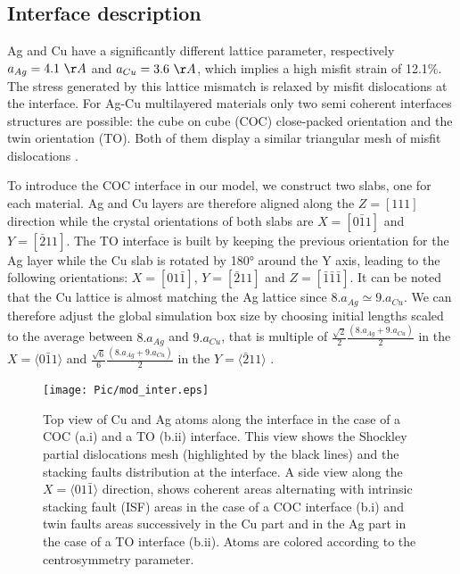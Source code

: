 \documentclass[final,3p,times,twocolumn]{elsarticle}
\begin{document}
	\subsection{Interface description}
	\label{subpart_interface}
Ag and Cu have a significantly different lattice parameter, respectively $a_{Ag}=4.1~\AA$ and $a_{Cu}=3.6~\AA$, which implies a high misfit strain of 12.1\%. The stress generated by this lattice mismatch is relaxed by misfit dislocations at the interface. For Ag-Cu multilayered materials only two semi coherent interfaces structures are possible: the cube on cube (COC) close-packed orientation and the twin orientation (TO). Both of them display a similar triangular mesh of misfit dislocations \cite{wang11SM,an15APL}.

To introduce the COC interface in our model, we construct two slabs, one for each material. Ag and Cu layers are therefore aligned along the $Z=[111]$ direction while the crystal orientations of both slabs are $X=[0\bar{1}1]$ and $Y=[\bar{2}11]$. The TO interface is built by keeping the previous orientation for the Ag layer while the Cu slab is rotated by 180° around the Y axis, leading to the following orientations: $X=[01\bar{1}]$, $Y=[\bar{2}11]$ and $Z=[\bar{1}\bar{1}\bar{1}]$. It can be noted that the Cu lattice is almost matching the Ag lattice since $8.a_{Ag}\simeq9.a_{Cu}$. 
We can therefore adjust the global simulation box size by choosing initial lengths scaled to the average between $8.a_{Ag}$ and $9.a_{Cu}$, that is multiple of 
$\frac{\sqrt{2}}{2}\frac{(8.a_{Ag}+9.a_{Cu})}{2}$ in the $X=\langle0\bar{1}1\rangle$ and $\frac{\sqrt{6}}{6}\frac{(8.a_{Ag}+9.a_{Cu})}{2}$ in the $Y=\langle\bar{2}11\rangle$ \cite{li15PM}. 

\begin{figure}[!h]
	\begin{center}
		\texttt{[image: Pic/mod\_inter.eps]} 
	\end{center}
	\caption{Top view of Cu and Ag atoms along the interface in the case of a COC (a.i) and a TO (b.ii) interface. This view shows the Shockley partial dislocations mesh (highlighted by the black lines) and the stacking faults distribution at the interface. A side view along the $X=\langle01\bar{1}\rangle$ direction, shows coherent areas alternating with intrinsic stacking fault (ISF) areas in the case of a COC interface (b.i) and twin faults areas successively in the Cu part and in the Ag part in the case of a TO interface (b.ii). Atoms are colored according to the centrosymmetry parameter.}\label{fig_mod_inter}
\end{figure}
\end{document}

